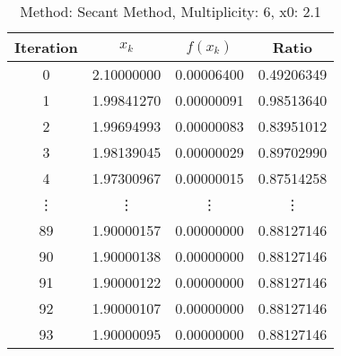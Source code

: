 \begin{table}
\centering
\caption{Method: Secant Method, Multiplicity: 6, x0: 2.1}
\label{tab:table_Secant_Method_6_2_1}
\begin{tabular}{c c c c}
\toprule
Iteration &      $x_k$ &   $f(x_k)$ &      Ratio \\
\midrule
        0 & 2.10000000 & 0.00006400 & 0.49206349 \\
        1 & 1.99841270 & 0.00000091 & 0.98513640 \\
        2 & 1.99694993 & 0.00000083 & 0.83951012 \\
        3 & 1.98139045 & 0.00000029 & 0.89702990 \\
        4 & 1.97300967 & 0.00000015 & 0.87514258 \\
   \vdots &     \vdots &     \vdots &     \vdots \\
       89 & 1.90000157 & 0.00000000 & 0.88127146 \\
       90 & 1.90000138 & 0.00000000 & 0.88127146 \\
       91 & 1.90000122 & 0.00000000 & 0.88127146 \\
       92 & 1.90000107 & 0.00000000 & 0.88127146 \\
       93 & 1.90000095 & 0.00000000 & 0.88127146 \\
\bottomrule
\end{tabular}
\end{table}

